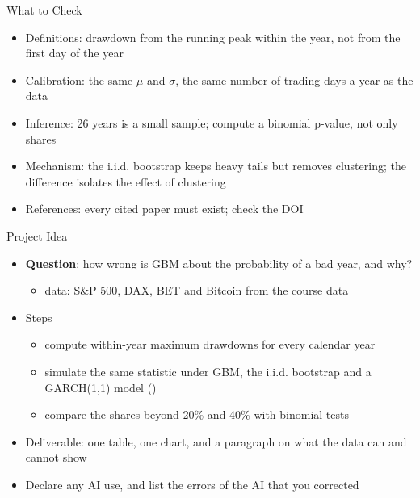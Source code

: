 \begin{frame}{What to Check}
\itemsize{\small}
\begin{itemize}
    \item Definitions: drawdown from the running peak within the year, not from the first day of the year
    \item Calibration: the same $\mu$ and $\sigma$, the same number of trading days a year as the data
    \item Inference: 26 years is a small sample; compute a binomial p-value, not only shares
    \item Mechanism: the i.i.d. bootstrap keeps heavy tails but removes clustering; the difference isolates the effect of clustering
    \item References: every cited paper must exist; check the DOI
\end{itemize}
\end{frame}

\begin{frame}{Project Idea}
\itemsize{\small}
\begin{itemize}
    \item \textbf{Question}: how wrong is GBM about the probability of a bad year, and why?
    \begin{itemize}
        \item data: S\&P 500, DAX, BET and Bitcoin from the course data
    \end{itemize}
    \item Steps
    \begin{itemize}
        \item compute within-year maximum drawdowns for every calendar year
        \item simulate the same statistic under GBM, the i.i.d. bootstrap and a GARCH(1,1) model ()
        \item compare the shares beyond 20\% and 40\% with binomial tests
    \end{itemize}
    \item Deliverable: one table, one chart, and a paragraph on what the data can and cannot show
    \item Declare any AI use, and list the errors of the AI that you corrected 
\end{itemize}
\end{frame}


